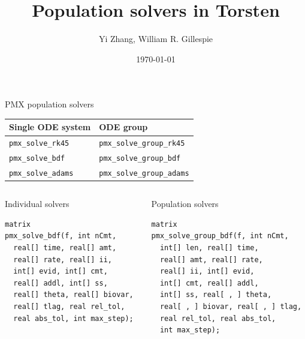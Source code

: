 \documentclass[presentation]{beamer}
\author{Yi Zhang, William R. Gillespie}
\date{\today}
\title{Population solvers in Torsten}
\begin{document}
\maketitle

\begin{frame}[fragile,label={sec:orgb8e2b76}]{PMX population solvers}
 \begin{center}
\begin{tabular}{ll}
Single ODE system & ODE group\\
\hline
\texttt{pmx\_solve\_rk45} & \texttt{pmx\_solve\_group\_rk45}\\
\texttt{pmx\_solve\_bdf} & \texttt{pmx\_solve\_group\_bdf}\\
\texttt{pmx\_solve\_adams} & \texttt{pmx\_solve\_group\_adams}\\
\end{tabular}

\end{center}

\begin{columns}
\begin{column}{0.45\columnwidth}
\begin{block}{Individual solvers}
\begin{verbatim}
matrix
pmx_solve_bdf(f, int nCmt,
  real[] time, real[] amt,
  real[] rate, real[] ii,
  int[] evid, int[] cmt,
  real[] addl, int[] ss,
  real[] theta, real[] biovar,
  real[] tlag, real rel_tol,
  real abs_tol, int max_step);
\end{verbatim}
\end{block}
\end{column}

\begin{column}{0.55\columnwidth}
\begin{block}{Population solvers}
\begin{verbatim}
matrix
pmx_solve_group_bdf(f, int nCmt,
  int[] len, real[] time,
  real[] amt, real[] rate,
  real[] ii, int[] evid,
  int[] cmt, real[] addl,
  int[] ss, real[ , ] theta,
  real[ , ] biovar, real[ , ] tlag,
  real rel_tol, real abs_tol,
  int max_step);
\end{verbatim}
\end{block}
\end{column}
\end{columns}
\end{frame}
\end{document}
